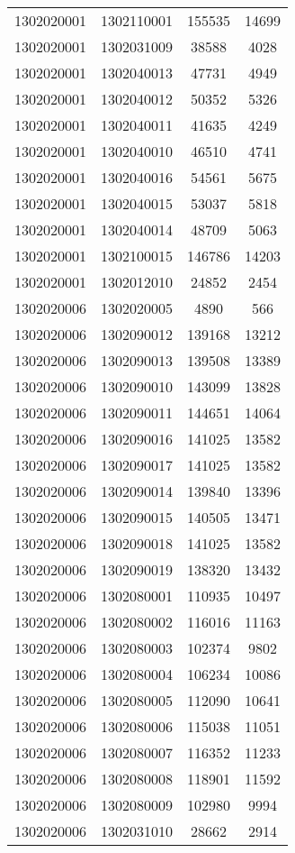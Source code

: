 \begin{longtable}{llcc}
1302020001 & 1302110001 & 155535 & 14699\\
1302020001 & 1302031009 & 38588 & 4028\\
1302020001 & 1302040013 & 47731 & 4949\\
1302020001 & 1302040012 & 50352 & 5326\\
1302020001 & 1302040011 & 41635 & 4249\\
1302020001 & 1302040010 & 46510 & 4741\\
1302020001 & 1302040016 & 54561 & 5675\\
1302020001 & 1302040015 & 53037 & 5818\\
1302020001 & 1302040014 & 48709 & 5063\\
1302020001 & 1302100015 & 146786 & 14203\\
1302020001 & 1302012010 & 24852 & 2454\\
1302020006 & 1302020005 & 4890 & 566\\
1302020006 & 1302090012 & 139168 & 13212\\
1302020006 & 1302090013 & 139508 & 13389\\
1302020006 & 1302090010 & 143099 & 13828\\
1302020006 & 1302090011 & 144651 & 14064\\
1302020006 & 1302090016 & 141025 & 13582\\
1302020006 & 1302090017 & 141025 & 13582\\
1302020006 & 1302090014 & 139840 & 13396\\
1302020006 & 1302090015 & 140505 & 13471\\
1302020006 & 1302090018 & 141025 & 13582\\
1302020006 & 1302090019 & 138320 & 13432\\
1302020006 & 1302080001 & 110935 & 10497\\
1302020006 & 1302080002 & 116016 & 11163\\
1302020006 & 1302080003 & 102374 & 9802\\
1302020006 & 1302080004 & 106234 & 10086\\
1302020006 & 1302080005 & 112090 & 10641\\
1302020006 & 1302080006 & 115038 & 11051\\
1302020006 & 1302080007 & 116352 & 11233\\
1302020006 & 1302080008 & 118901 & 11592\\
1302020006 & 1302080009 & 102980 & 9994\\
1302020006 & 1302031010 & 28662 & 2914\\

\end{longtable}
